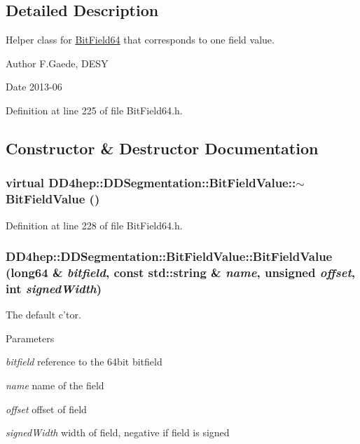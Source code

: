 \subsection{Detailed Description}
Helper class for \hyperlink{class_d_d4hep_1_1_d_d_segmentation_1_1_bit_field64}{BitField64} that corresponds to one field value. \begin{DoxyAuthor}{Author}
F.Gaede, DESY 
\end{DoxyAuthor}
\begin{DoxyDate}{Date}
2013-\/06 
\end{DoxyDate}


Definition at line 225 of file BitField64.h.

\subsection{Constructor \& Destructor Documentation}
\hypertarget{class_d_d4hep_1_1_d_d_segmentation_1_1_bit_field_value_a182cf1a9ae2449b88fb89f37bba2abb7}{
\subsubsection[{$\sim$BitFieldValue}]{\setlength{\rightskip}{0pt plus 5cm}virtual DD4hep::DDSegmentation::BitFieldValue::$\sim$BitFieldValue ()}}
\label{class_d_d4hep_1_1_d_d_segmentation_1_1_bit_field_value_a182cf1a9ae2449b88fb89f37bba2abb7}


Definition at line 228 of file BitField64.h.\hypertarget{class_d_d4hep_1_1_d_d_segmentation_1_1_bit_field_value_aa8ff52eb2b15cd6a50d6db56b658c80e}{
\subsubsection[{BitFieldValue}]{\setlength{\rightskip}{0pt plus 5cm}DD4hep::DDSegmentation::BitFieldValue::BitFieldValue ({\bf long64} \& {\em bitfield}, \/  const std::string \& {\em name}, \/  unsigned {\em offset}, \/  int {\em signedWidth})}}
\label{class_d_d4hep_1_1_d_d_segmentation_1_1_bit_field_value_aa8ff52eb2b15cd6a50d6db56b658c80e}
The default c'tor. 
\begin{DoxyParams}{Parameters}
\item[{\em bitfield}]reference to the 64bit bitfield \item[{\em name}]name of the field \item[{\em offset}]offset of field \item[{\em signedWidth}]width of field, negative if field is signed \end{DoxyParams}


